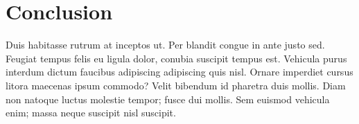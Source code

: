 \section{Conclusion}
\label{sec:conclusion}

Duis habitasse rutrum at inceptos ut. Per blandit congue in ante justo sed.
Feugiat tempus felis eu ligula dolor, conubia suscipit tempus est. Vehicula
purus interdum dictum faucibus adipiscing adipiscing quis nisl. Ornare
imperdiet cursus litora maecenas ipsum commodo? Velit bibendum id pharetra duis
mollis. Diam non natoque luctus molestie tempor; fusce dui mollis. Sem euismod
vehicula enim; massa neque suscipit nisl suscipit.
